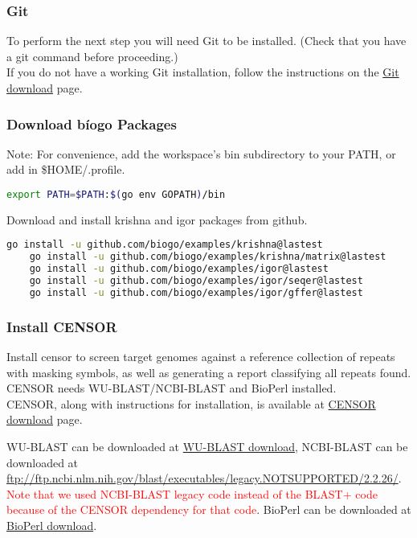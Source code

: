 \documentclass[a4paper,12pt]{article}
\begin{document}
	\subsubsection{Git}
	To perform the next step you will need Git to be installed. (Check that you have a git command before proceeding.) \\
	
	\noindent If you do not have a working Git installation, follow the instructions on the \href{https://git-scm.com/downloads}{\color{blue}Git download} page.
	
	\subsubsection{Download b\'iogo Packages}
	{\color{red} Note:}  For convenience, add the workspace's bin subdirectory to your PATH, or add in \$HOME/.profile. 
	\begin{lstlisting}[language=bash]
	export PATH=$PATH:$(go env GOPATH)/bin \end{lstlisting}
	\noindent Download and install krishna and igor packages from github. 
	
	\begin{lstlisting}[language=bash, columns=flexible]
	go install -u github.com/biogo/examples/krishna@lastest
	go install -u github.com/biogo/examples/krishna/matrix@lastest
	go install -u github.com/biogo/examples/igor@lastest
	go install -u github.com/biogo/examples/igor/seqer@lastest
	go install -u github.com/biogo/examples/igor/gffer@lastest \end{lstlisting}
	
	\subsubsection{ Install CENSOR}
	Install censor to screen target genomes against a reference collection of repeats with masking symbols, as well as generating a report classifying all repeats found. CENSOR needs WU-BLAST/NCBI-BLAST and BioPerl installed.\\
	
	\noindent CENSOR, along with instructions for installation, is available at \href{http://www.girinst.org/downloads/software/censor/} {\color{blue}CENSOR download} page.
	
	\noindent WU-BLAST can be downloaded at \href{https://www.advbiocomp.com/blast/obsolete/}{\color{blue}WU-BLAST download}, NCBI-BLAST can be downloaded at \url{ftp://ftp.ncbi.nlm.nih.gov/blast/executables/legacy.NOTSUPPORTED/2.2.26/}. 
	\textcolor{red}{Note that we used NCBI-BLAST legacy code instead of the BLAST+ code because of the CENSOR dependency for that code}.  
	BioPerl can be downloaded at \href{http://bioperl.org/INSTALL.html}{\color{blue}BioPerl download}.
\end{document}
